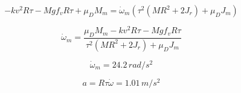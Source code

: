 \documentclass[main.tex]{subfiles}
\begin{document}
\begin{equation}
  -kv^2R\tau - Mgf_vR\tau + \mu_DM_m  = \dot{\omega}_m(\tau^2(MR^2 + 2J_r) + \mu_DJ_m)
\end{equation}

\begin{equation}
 \dot{\omega}_m =   \dfrac{\mu_DM_m  -kv^2R\tau - Mgf_vR\tau}{\tau^2(MR^2 + 2J_r) + \mu_DJ_m}
\end{equation}

\begin{equation}
   \dot{\omega}_m = 24.2\,rad/s^2
\end{equation}

\begin{equation}
   a = R\tau\dot{\omega} = 1.01\,m/s^2
\end{equation}
\end{document}

